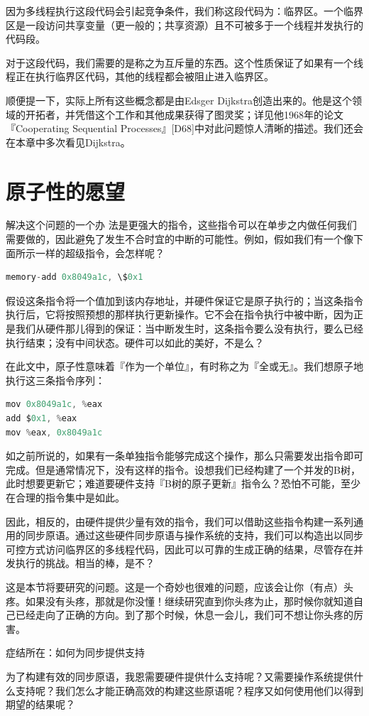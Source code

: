 因为多线程执行这段代码会引起竞争条件，我们称这段代码为：临界区。一个临界区是一段访问共享变量（更一般的；共享资源）且不可被多于一个线程并发执行的代码段。

对于这段代码，我们需要的是称之为互斥量的东西。这个性质保证了如果有一个线程正在执行临界区代码，其他的线程都会被阻止进入临界区。

顺便提一下，实际上所有这些概念都是由Edsger Dijkstra创造出来的。他是这个领域的开拓者，并凭借这个工作和其他成果获得了图灵奖；详见他1968年的论文『Cooperating Sequential Processes』[D68]中对此问题惊人清晰的描述。我们还会在本章中多次看见Dijkstra。

\section{原子性的愿望}
解决这个问题的一个办
法是更强大的指令，这些指令可以在单步之内做任何我们需要做的，因此避免了发生不合时宜的中断的可能性。例如，假如我们有一个像下面所示一样的超级指令，会怎样呢？
\begin{lstlisting}[language=C]
memory-add 0x8049a1c, \$0x1
\end{lstlisting}

假设这条指令将一个值加到该内存地址，并硬件保证它是原子执行的；当这条指令执行后，它将按照预想的那样执行更新操作。它不会在指令执行中被中断，因为正是我们从硬件那儿得到的保证：当中断发生时，这条指令要么没有执行，要么已经执行结束；没有中间状态。硬件可以如此的美好，不是么？

在此文中，原子性意味着『作为一个单位』，有时称之为『全或无』。我们想原子地执行这三条指令序列：
\begin{lstlisting}[language=C]
mov 0x8049a1c, %eax
add $0x1, %eax
mov %eax, 0x8049a1c
\end{lstlisting}

如之前所说的，如果有一条单独指令能够完成这个操作，那么只需要发出指令即可完成。但是通常情况下，没有这样的指令。设想我们已经构建了一个并发的B树，此时想要更新它；难道要硬件支持『B树的原子更新』指令么？恐怕不可能，至少在合理的指令集中是如此。

因此，相反的，由硬件提供少量有效的指令，我们可以借助这些指令构建一系列通用的同步原语。通过这些硬件同步原语与操作系统的支持，我们可以构造出以同步可控方式访问临界区的多线程代码，因此可以可靠的生成正确的结果，尽管存在并发执行的挑战。相当的棒，是不？

这是本节将要研究的问题。这是一个奇妙也很难的问题，应该会让你（有点）头疼。如果没有头疼，那就是你没懂！继续研究直到你头疼为止，那时候你就知道自己已经走向了正确的方向。到了那个时候，休息一会儿，我们可不想让你头疼的厉害。
\begin{tcolorbox}[colframe=grey,colback= grey,arc=0pt,left=6pt,right=6pt,top=6pt,bottom=6pt,boxsep=0pt]
\begin{center}症结所在：如何为同步提供支持\end{center}

为了构建有效的同步原语，我恩需要硬件提供什么支持呢？又需要操作系统提供什么支持呢？我们怎么才能正确高效的构建这些原语呢？程序又如何使用他们以得到期望的结果呢？
\end{tcolorbox}

